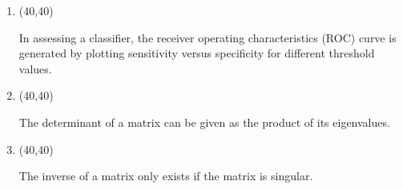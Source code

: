 \documentclass[11pt,twoside]{article}
\newcommand{\?}{\stackrel{?}{=}}
\newcommand{\ol}{\overline}
\begin{document}
\begin{enumerate}[\bf (i)]
  
    \smallskip

\item \hfill
  \begin{minipage}{.1\linewidth}
    \framebox(40,40){} %
  \end{minipage}\quad
  \begin{minipage}{.85\linewidth}
    In assessing a classifier, the receiver operating characteristics (ROC) curve is generated by plotting sensitivity
    versus specificity for different threshold values.
  \end{minipage}

  \smallskip
    
  \item \hfill
  \begin{minipage}{.1\linewidth}
    \framebox(40,40){} %
  \end{minipage}\quad
  \begin{minipage}{.85\linewidth}
    The determinant of a matrix can be given as the product of its eigenvalues.
  \end{minipage}

  \smallskip
  

  

  
\item \hfill
  \begin{minipage}{.1\linewidth}
    \framebox(40,40){} %
  \end{minipage}\quad
  \begin{minipage}{.85\linewidth}
    The inverse of a matrix only exists if the matrix is singular.
  \end{minipage}


\end{enumerate}
\end{document}
